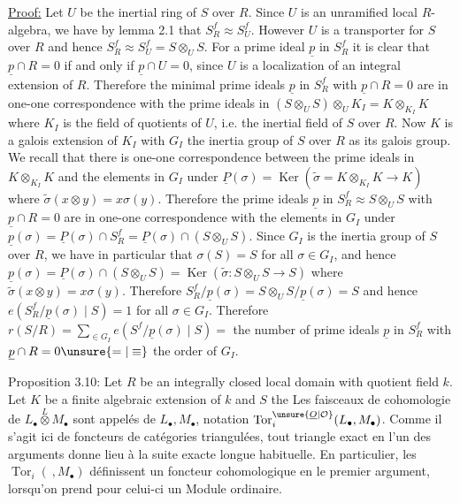 \uline{Proof:} Let $U$ be the inertial ring of $S$ over $R$. Since $U$ is an unramified local $R$-algebra, we have by lemma 2.1 that $S_R^f\approx S_U^f$. However $U$ is a transporter for $S$ over $R$ and hence $S_R^f\approx S_U^f=S\otimes_U S$. For a prime ideal $\underline p$ in $S_R^f$ it is clear that $\underline p\cap R=0$ if and only if $\underline p\cap U=0$, since $U$ is a localization of an integral extension of $R$. Therefore the minimal prime ideals $\underline p$ in $S_R^f$ with $\underline p\cap R=0$ are in one-one correspondence with the prime ideals in $(S\otimes_U S)\otimes_U K_I=K\otimes_{K_I}K$ where $K_I$ is the field of quotients of $U$, i.e. the inertial field of $S$ over $R$. Now $K$ is a galois extension of $K_I$ with $G_I$ the inertia group of $S$ over $R$ as its galois group. We recall that there is one-one correspondence between the prime ideals in $K\otimes_{K_I}K$ and the elements in $G_I$ under $\underline P(\sigma)=\operatorname{Ker}(\widetilde\sigma=K\otimes_{K_I}K\longrightarrow K)$ where $\widetilde\sigma(x\otimes y)=x\sigma(y)$. Therefore the prime ideals $\underline p$ in $S_R^f\approx S\otimes_U S$ with $\underline p\cap R=0$ are in one-one correspondence with the elements in $G_I$ under $\underline p(\sigma)=\underline P(\sigma)\cap S_R^f=\underline P(\sigma)\cap(S\otimes_U S)$. Since $G_I$ is the inertia group of $S$ over $R$, we have in particular that $\sigma(S)=S$ for all $\sigma\in G_I$, and hence $\underline p(\sigma)=\underline P(\sigma)\cap(S\otimes_U S)=\operatorname{Ker}(\widetilde\sigma:S\otimes_U S\longrightarrow S)$ where $\widetilde\sigma(x\otimes y)=x\sigma(y)$. Therefore $S_R^f/\underline p(\sigma)=S\otimes_U S/\underline p(\sigma)=S$ and hence $e(S_R^f/\underline p(\sigma)\mid S)=1$ for all $\sigma\in G_I$. Therefore $r(S/R)=\sum_{\in G_I}e(S^f/\underline p(\sigma)\mid S)=$ the number of prime ideals $\underline p$ in $S_R^f$ with $\underline p\cap R=0\unsure{=|\equiv}$ the order of $G_I$.

Proposition 3.10: Let $R$ be an integrally closed local domain with quotient field $k$. Let $K$ be a finite algebraic extension of $k$ and $S$ the
Les  faisceaux de cohomologie de $L_\bullet\overset{L}{\otimes}M_\bullet$ sont appelés \uline{} de $L_\bullet,M_\bullet$, notation $\operatorname{Tor}_i^{\unsure{\underline O|\mathcal O}}(L_\bullet,M_\bullet)$.  Comme il s'agit ici de foncteurs  de catégories triangulées, tout triangle exact en l'un des arguments donne lieu à la suite exacte longue habituelle. En particulier, les $\operatorname{Tor}_i(\ ,M_\bullet)$ définissent un foncteur cohomologique en le premier argument, lorsqu'on prend pour celui-ci un Module ordinaire.

